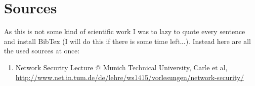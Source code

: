 \documentclass{scrartcl}
\begin{document}
\section{Sources}
As this is not some kind of scientific work I was to lazy to quote every sentence and install BibTex (I will do this if there is some time left...). Instead here are all the used sources at once: 
\begin{enumerate}
\item Network Security Lecture @ Munich Technical University, Carle et al,  \url{http://www.net.in.tum.de/de/lehre/ws1415/vorlesungen/network-security/}
\end{enumerate}
  
\end{document}
